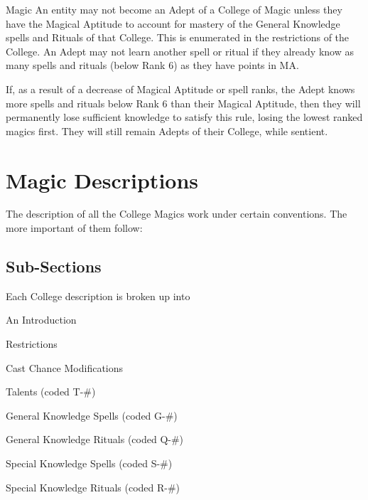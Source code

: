 \begin{Chapter}{Magic}
An entity may not become an Adept of a College of Magic unless they
have the Magical Aptitude to account for mastery of the General
Knowledge spells and Rituals of that College.  This is enumerated in
the restrictions of the College.  An Adept may not learn another spell
or ritual if they already know as many spells and rituals (below Rank
6) as they have points in MA.

If, as a result of a decrease of Magical Aptitude or spell ranks, the
Adept knows more spells and rituals below Rank 6 than their Magical
Aptitude, then they will permanently lose sufficient knowledge to
satisfy this rule, losing the lowest ranked magics first. They will
still remain Adepts of their College, while sentient.


\section{Magic Descriptions}

The description of all the College Magics work under certain
conventions.  The more important of them follow:

\subsection{Sub-Sections}

Each College description is broken up into  

\begin{Itemize}
  
\item An Introduction  

\item Restrictions  

\item Cast Chance Modifications  

\item Talents (coded T-\#)  

\item General Knowledge Spells (coded G-\#)  

\item General Knowledge Rituals (coded Q-\#)  

\item Special Knowledge Spells (coded S-\#)  

\item Special Knowledge Rituals (coded R-\#) 

\end{Itemize}



\end{Chapter}
